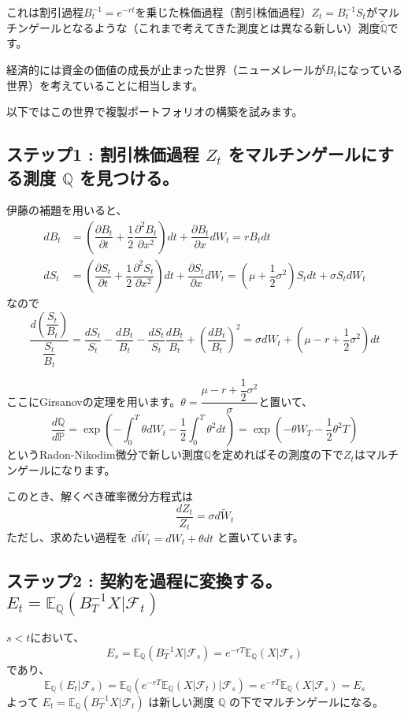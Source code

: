 \documentclass[uplatex,a4j,12pt,dvipdfmx]{jsarticle}
\begin{document}
これは割引過程$B^{-1}_{t}=e^{-rt}$を乗じた株価過程（割引株価過程）$Z_{t} = B^{-1}_{t} S_{t}$がマルチンゲールとなるような（これまで考えてきた測度とは異なる新しい）測度$\mathbb{\tilde Q}$です。

経済的には資金の価値の成長が止まった世界（ニューメレールが$B_{t}$になっている世界）を考えていることに相当します。

以下ではこの世界で複製ポートフォリオの構築を試みます。

\subsection{ステップ1 : 割引株価過程 $Z_{t}$ をマルチンゲールにする測度 $\mathbb{Q}$ を見つける。}
伊藤の補題を用いると、
\begin{align*}
	dB_{t} & = \left( \dfrac{\partial B_{t}}{\partial t} + \dfrac{1}{2} \dfrac{\partial^{2} B_{t}}{\partial x^{2}} \right) dt + \dfrac{\partial B_{t}}{\partial x} dW_{t} = r B_{t} dt                                                                  \\
	dS_{t} & = \left( \dfrac{\partial S_{t}}{\partial t} + \dfrac{1}{2} \dfrac{\partial^{2} S_{t}}{\partial x^{2}} \right) dt + \dfrac{\partial S_{t}}{\partial x} dW_{t} = \left( \mu + \dfrac{1}{2} \sigma^{2} \right) S_{t} dt + \sigma S_{t} dW_{t}
\end{align*}
なので
$$ \dfrac{d \left( \dfrac{S_{t}}{B_{t}} \right) }{ \dfrac{S_{t}}{B_{t}} } = \dfrac{dS_{t}}{S_{t}} - \dfrac{dB_{t}}{B_{t}} - \dfrac{dS_{t}}{S_{t}} \dfrac{dB_{t}}{B_{t}} + \left( \dfrac{dB_{t}}{B_{t}} \right)^{2} = \sigma d W_{t} + \left( \mu - r + \dfrac{1}{2} \sigma^{2} \right) dt $$

ここにGirsanovの定理を用います。$\theta = \dfrac{\mu - r + \dfrac{1}{2} \sigma^{2}}{\sigma}$と置いて、
$$ \dfrac{d \mathbb{Q}}{d \mathbb{P}} = \exp \left( - \int^{T}_{0} \theta d W_{t} - \dfrac{1}{2} \int^{T}_{0} \theta^{2} dt \right) = \exp \left( - \theta W_{T} - \dfrac{1}{2} \theta^{2} T \right) $$
というRadon-Nikodim微分で新しい測度$\mathbb{Q}$を定めればその測度の下で$Z_{t}$はマルチンゲールになります。

このとき、解くべき確率微分方程式は
$$ \dfrac{dZ_{t}}{Z_{t}} = \sigma d \tilde{W}_{t} $$
ただし、求めたい過程を $d \tilde{W}_{t} = d W_{t} + \theta dt$ と置いています。

\subsection{ステップ2 : 契約を過程に変換する。 $E_{t} = \mathbb{E}_{\mathbb{Q}}(B^{-1}_{T} X | \mathcal{F}_{t})$}
$s<t$において、
$$ E_{s} = \mathbb{E}_{\mathbb{Q}}(B^{-1}_{T} X | \mathcal{F}_{s}) = e^{-rT} \mathbb{E}_{\mathbb{Q}}( X | \mathcal{F}_{s}) $$
であり、
$$ \mathbb{E}_{\mathbb{Q}}( E_{t} | \mathcal{F}_{s}) = \mathbb{E}_{\mathbb{Q}} \left( e^{-rT} \mathbb{E}_{\mathbb{Q}}( X | \mathcal{F}_{t}) \Big| \mathcal{F}_{s} \right) = e^{-rT} \mathbb{E}_{\mathbb{Q}}( X | \mathcal{F}_{s}) = E_{s} $$
よって $E_{t} = \mathbb{E}_{\mathbb{Q}}(B^{-1}_{T} X | \mathcal{F}_{t})$ は新しい測度 $\mathbb{Q}$ の下でマルチンゲールになる。
\end{document}
